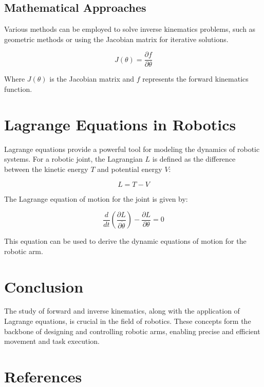 \documentclass{article}
\begin{document}
\subsection{Mathematical Approaches}
Various methods can be employed to solve inverse kinematics problems, such as geometric methods or using the Jacobian matrix for iterative solutions.

\[
J(\theta) = \frac{\partial f}{\partial \theta}
\]

Where \( J(\theta) \) is the Jacobian matrix and \( f \) represents the forward kinematics function.

\section{Lagrange Equations in Robotics}
Lagrange equations provide a powerful tool for modeling the dynamics of robotic systems. For a robotic joint, the Lagrangian \( L \) is defined as the difference between the kinetic energy \( T \) and potential energy \( V \):

\[
L = T - V
\]

The Lagrange equation of motion for the joint is given by:

\[
\frac{d}{dt} \left( \frac{\partial L}{\partial \dot{\theta}} \right) - \frac{\partial L}{\partial \theta} = 0
\]

This equation can be used to derive the dynamic equations of motion for the robotic arm.

\section{Conclusion}
The study of forward and inverse kinematics, along with the application of Lagrange equations, is crucial in the field of robotics. These concepts form the backbone of designing and controlling robotic arms, enabling precise and efficient movement and task execution.

\section{References}
\end{document}
